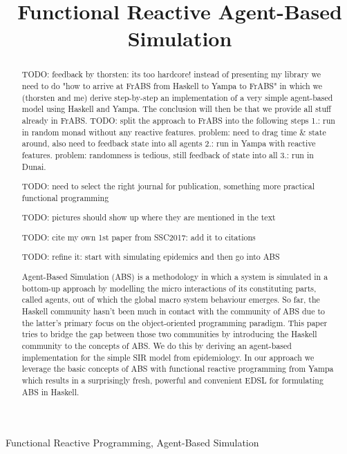 \documentclass[10pt, conference, onecolumn]{../../papers/templates/IEEEtran/IEEEtran}
\title{Functional Reactive Agent-Based Simulation}
\author{
	\IEEEauthorblockN{Jonathan Thaler}
	\IEEEauthorblockA{School of Computer Science\\
		University of Nottingham\\
		jonathan.thaler@nottingham.ac.uk}
		
	\and
		
	\IEEEauthorblockN{Thorsten Altenkirch}
	\IEEEauthorblockA{School of Computer Science\\
		University of Nottingham\\
		thorsten.altenkirch@nottingham.ac.uk}
}
\begin{document}
\maketitle 

\begin{abstract}
TODO: feedback by thorsten: its too hardcore! instead of presenting my library we need to do "how to arrive at FrABS from Haskell to Yampa to FrABS" in which we (thorsten and me) derive step-by-step an implementation of a very simple agent-based model using Haskell and Yampa. The conclusion will then be that we provide all stuff already in FrABS. 
TODO: split the approach to FrABS into the following steps
	1.: run in random monad without any reactive features. problem: need to drag time \& state around, also need to feedback state into all agents
	2.: run in Yampa with reactive features. problem: randomness is tedious, still feedback of state into all
	3.: run in Dunai.
	
TODO: need to select the right journal for publication, something more practical functional programming

TODO: pictures should show up where they are mentioned in the text

TODO: cite my own 1st paper from SSC2017: add it to citations

TODO: refine it: start with simulating epidemics and then go into ABS

Agent-Based Simulation (ABS) is a methodology in which a system is simulated in a bottom-up approach by modelling the micro interactions of its constituting parts, called agents, out of which the global macro system behaviour emerges. So far, the Haskell community hasn't been much in contact with the community of ABS due to the latter's primary focus on the object-oriented programming paradigm. This paper tries to bridge the gap between those two communities by introducing the Haskell community to the concepts of ABS. We do this by deriving an agent-based implementation for the simple SIR model from epidemiology. In our approach we leverage the basic concepts of ABS with functional reactive programming from Yampa which results in a surprisingly fresh, powerful and convenient EDSL for formulating ABS in Haskell.
\end{abstract}

\begin{IEEEkeywords}
Functional Reactive Programming, Agent-Based Simulation
\end{IEEEkeywords}


\end{document}
